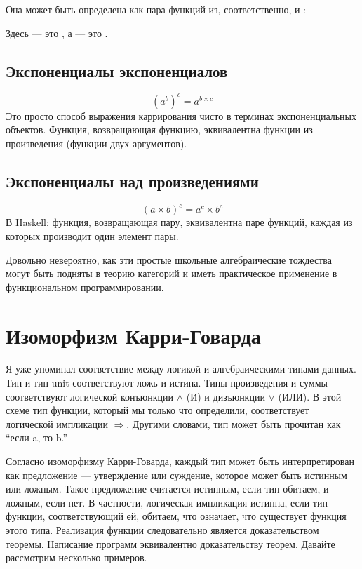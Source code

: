 Она может быть определена как пара функций из, соответственно,
 и :

Здесь  --- это , а  --- это .

\subsection{Экспоненциалы экспоненциалов}

\[(a^{b})^{c} = a^{b \times c}\]
Это просто способ выражения каррирования чисто в терминах экспоненциальных
объектов. Функция, возвращающая функцию, эквивалентна функции
из произведения (функции двух аргументов).

\subsection{Экспоненциалы над произведениями}

\[(a \times b)^{c} = a^{c} \times b^{c}\]
В Haskell: функция, возвращающая пару, эквивалентна паре
функций, каждая из которых производит один элемент пары.

Довольно невероятно, как эти простые школьные алгебраические тождества
могут быть подняты в теорию категорий и иметь практическое применение в
функциональном программировании.

\section{Изоморфизм Карри-Говарда}

Я уже упоминал соответствие между логикой и алгебраическими
типами данных. Тип  и тип unit \code{()}
соответствуют ложь и истина. Типы произведения и суммы соответствуют
логической конъюнкции $\wedge$ (И) и дизъюнкции $\vee$ (ИЛИ). В этой схеме
тип функции, который мы только что определили, соответствует логической импликации $\Rightarrow$.
Другими словами, тип  может быть прочитан как ``если
a, то b.''

Согласно изоморфизму Карри-Говарда, каждый тип может быть интерпретирован
как предложение --- утверждение или суждение, которое может быть истинным или
ложным. Такое предложение считается истинным, если тип обитаем,
и ложным, если нет. В частности, логическая импликация истинна, если
тип функции, соответствующий ей, обитаем, что означает, что
существует функция этого типа. Реализация функции
следовательно является доказательством теоремы. Написание программ эквивалентно
доказательству теорем. Давайте рассмотрим несколько примеров.

